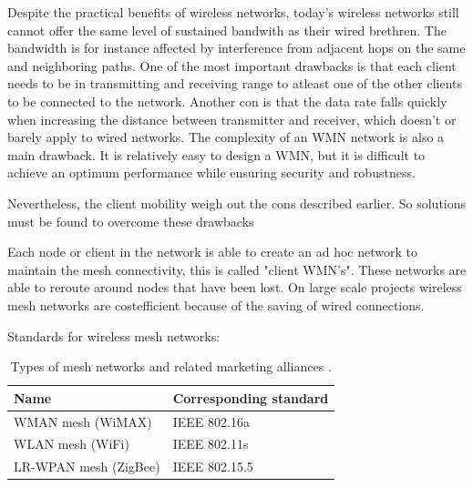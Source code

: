 \documentclass[10pt,a4paper]{article}
\begin{document}
Despite the practical benefits of wireless networks, today's wireless networks still cannot offer the same level of sustained bandwith as their wired brethren. The bandwidth is for instance affected by interference from adjacent hops on the same and neighboring paths. \cite{architectureandalgorithmsmultichannelwirelessmeshnetwork} One of the most important drawbacks is that each client needs to be in transmitting and receiving range to atleast one of the other clients to be connected to the network. \cite{wirelessmeshnetworksopportunitiesandchallenges} Another con is that the data rate falls quickly when increasing the distance between transmitter and receiver, which doesn't or barely apply to wired networks. \cite{architectureandalgorithmsmultichannelwirelessmeshnetwork} The complexity of an WMN network is also a main drawback. It is relatively easy to design a WMN, but it is difficult to achieve an optimum performance while ensuring security and robustness.\cite{wirelessmeshnetworksopportunitiesandchallenges} 


Nevertheless, the client mobility weigh out the cons described earlier. So solutions must be found to overcome these drawbacks

Each node or client in the network is able to create an ad hoc network to maintain the mesh connectivity, this is called "client WMN's". These networks are able to reroute around nodes that have been lost. On large scale projects wireless mesh networks are costefficient because of the saving of wired connections.\cite{meshnetworking} 





Standards for wireless mesh networks:\cite{emergingstandarsforwirelessmeshtechnology}

\begin{table}[H]
\centering
\caption{Types of mesh networks and related marketing alliances \cite{emergingstandarsforwirelessmeshtechnology}.}
\label{meshstandard}
\begin{tabular}{|l|l|}
    \hline
    \textbf{Name}         & \textbf{Corresponding standard} \\ \hline
    WMAN mesh (WiMAX)     & IEEE 802.16a                    \\ \hline
    WLAN mesh (WiFi)      & IEEE 802.11s                    \\ \hline
    LR-WPAN mesh (ZigBee) & IEEE 802.15.5                   \\ \hline
\end{tabular}
\end{table}
\end{document}
